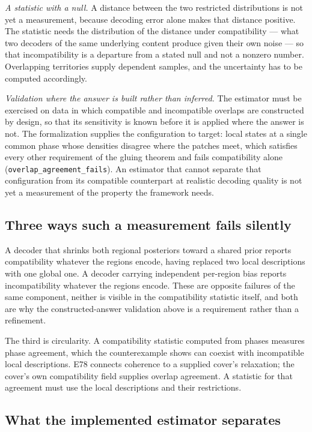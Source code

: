 \documentclass{article}
\begin{document}
\emph{A statistic with a null.} A distance between the two restricted distributions is not yet a measurement, because decoding error alone makes that distance positive. The statistic needs the distribution of the distance under compatibility --- what two decoders of the same underlying content produce given their own noise --- so that incompatibility is a departure from a stated null and not a nonzero number. Overlapping territories supply dependent samples, and the uncertainty has to be computed accordingly.

\emph{Validation where the answer is built rather than inferred.} The estimator must be exercised on data in which compatible and incompatible overlaps are constructed by design, so that its sensitivity is known before it is applied where the answer is not. The formalization supplies the configuration to target: local states at a single common phase whose densities disagree where the patches meet, which satisfies every other requirement of the gluing theorem and fails compatibility alone (\nolinkurl{overlap_agreement_fails}). An estimator that cannot separate that configuration from its compatible counterpart at realistic decoding quality is not yet a measurement of the property the framework needs.

\subsection{Three ways such a measurement fails silently}

A decoder that shrinks both regional posteriors toward a shared prior reports compatibility whatever the regions encode, having replaced two local descriptions with one global one. A decoder carrying independent per-region bias reports incompatibility whatever the regions encode. These are opposite failures of the same component, neither is visible in the compatibility statistic itself, and both are why the constructed-answer validation above is a requirement rather than a refinement.

The third is circularity. A compatibility statistic computed from phases measures phase agreement, which the counterexample shows can coexist with incompatible local descriptions. E78 connects coherence to a supplied cover's relaxation; the cover's own compatibility field supplies overlap agreement. A statistic for that agreement must use the local descriptions and their restrictions.

\subsection{What the implemented estimator separates}
\end{document}
